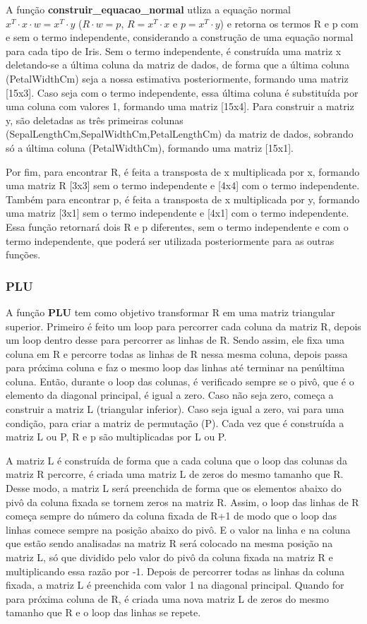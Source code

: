 \documentclass[a4paper,12pt,twoside]{article}
\begin{document}
   A função \textbf{construir\_equacao\_normal} utliza a equação normal $x^{T}\cdot x\cdot w=x^{T}\cdot y$ ($R\cdot w=p$, $R=x^{T}\cdot x$ e $p = x^{T}\cdot y$) e retorna os termos R e p com e sem o termo independente, considerando a construção de uma equação normal para cada tipo de Iris. Sem o termo independente, é construída uma matriz x deletando-se a última coluna da matriz de dados, de forma que a última coluna (PetalWidthCm) seja a nossa estimativa posteriormente, formando uma matriz [15x3]. Caso seja com o termo independente, essa última coluna é substituída por uma coluna com valores 1, formando uma matriz [15x4]. Para construir a matriz y, são deletadas as três primeiras colunas (SepalLengthCm,SepalWidthCm,PetalLengthCm) da matriz de dados, sobrando só a última coluna (PetalWidthCm), formando uma matriz [15x1]. 
   
   Por fim, para encontrar R, é feita a transposta de x multiplicada por x, formando uma matriz R [3x3] sem o termo independente e [4x4] com o termo independente. Também para encontrar p, é feita a transposta de x multiplicada por y, formando uma matriz [3x1] sem o termo independente e [4x1] com o termo independente. Essa função retornará dois R e p diferentes, sem o termo independente e com o termo independente, que poderá ser utilizada posteriormente para as outras funções.
\subsubsection{PLU}
A função \textbf{PLU} tem como objetivo transformar R em uma matriz triangular superior. Primeiro é feito um loop para percorrer cada coluna da matriz R, depois um loop dentro desse para percorrer as linhas de R. Sendo assim, ele fixa uma coluna em R e percorre todas as linhas de R nessa mesma coluna, depois passa para próxima coluna e faz o mesmo loop das linhas até terminar na penúltima coluna. Então, durante o loop das colunas, é verificado sempre se o pivô, que é o elemento da diagonal principal, é igual a zero. Caso não seja zero, começa a construir a matriz L (triangular inferior). Caso seja igual a zero, vai para uma condição, para criar a matriz de permutação (P). Cada vez que é construída a matriz L ou P, R e p são multiplicadas por L ou P.

A matriz L é construída de forma que a cada coluna que o loop das colunas da matriz R percorre, é criada uma matriz L de zeros do mesmo tamanho que R. Desse modo, a matriz L será preenchida de forma que os elementos abaixo do pivô da coluna fixada se tornem zeros na matriz R. Assim, o loop das linhas de R começa sempre do número da coluna fixada de R+1 de modo que o loop das linhas comece sempre na posição abaixo do pivô. E o valor na linha e na coluna que estão sendo analisadas na matriz R será colocado na mesma posição na matriz L, só que dividido pelo valor do pivô da coluna fixada na matriz R e multiplicando essa razão por -1. Depois de percorrer todas as linhas da coluna fixada, a matriz L é preenchida com valor 1 na diagonal principal. Quando for para próxima coluna de R, é criada uma nova matriz L de zeros do mesmo tamanho que R e o loop das linhas se repete. 
\end{document}
